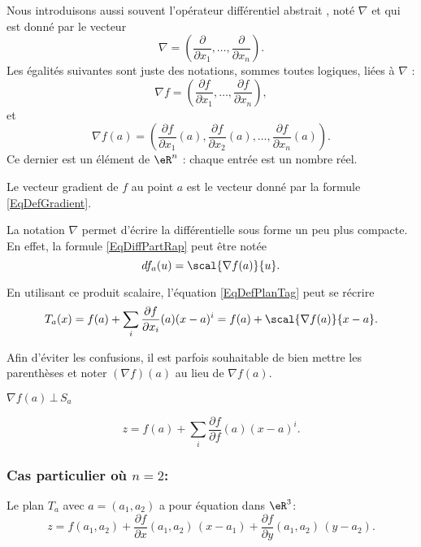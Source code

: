Nous introduisons aussi souvent l'opérateur différentiel abstrait , noté $\nabla$ et qui est donné par le vecteur
\begin{equation}
    \nabla=\left( \frac{ \partial  }{ \partial x_1 },\ldots,\frac{ \partial  }{ \partial x_n } \right).
\end{equation}
Les égalités suivantes sont juste des notations, sommes toutes logiques, liées à $\nabla$ :
\begin{equation}
    \nabla f=\left( \frac{ \partial f }{ \partial x_1 },\ldots,\frac{ \partial f }{ \partial x_n } \right),
\end{equation}
et
\begin{equation}        \label{EqDefGradient}
    \nabla f(a) = \left(\frac{\partial f}{\partial x_1}(a), \frac{\partial f}{\partial x_2}(a), \ldots, \frac{\partial f}{\partial x_n}(a)\right).
\end{equation}
Ce dernier est un élément de $\eR^n$ : chaque entrée est un nombre réel.

\begin{definition} 
Le vecteur gradient de $f$ au point $a$ est le vecteur donné par la formule \eqref{EqDefGradient}.
\end{definition}
La notation $\nabla$ permet d'écrire la différentielle sous forme un peu plus compacte. En effet, la formule \eqref{EqDiffPartRap} peut être notée
\begin{equation}
    df_a(u)=\scal{\nabla f(a)}{u}.
\end{equation}

En utilisant ce produit scalaire, l'équation \eqref{EqDefPlanTag} peut se récrire
\begin{equation}
    T_a(x)=f(a)+\sum_i\frac{ \partial f }{ \partial x_i }(a)(x-a)^i=f(a)+\scal{\nabla f(a)}{x-a}.
\end{equation}

Afin d'éviter les confusions, il est parfois souhaitable de bien mettre les parenthèses et noter $(\nabla f)(a)$ au lieu de $\nabla f(a)$.

\begin{proposition}
$\nabla f(a)\,\bot \,S_a$
\end{proposition}


\begin{equation}        \label{EqPlanTgSansNabla}
    z=f(a)+\sum_i\frac{ \partial f }{ \partial f }(a)(x-a)^i.
\end{equation}

\subsubsection*{Cas particulier où $n=2$:} 
Le plan $T_a$ avec $a=(a_1,a_2)$ a pour équation dans $\eR^3$:
\begin{equation}        \label{EqPlanTgEnDimDeux}
    z = f(a_1,a_2) + \frac{\partial f}{\partial x}(a_1,a_2)\,(x-a_1)+ \frac{\partial f}{\partial y}(a_1,a_2)\,(y-a_2).
\end{equation}

